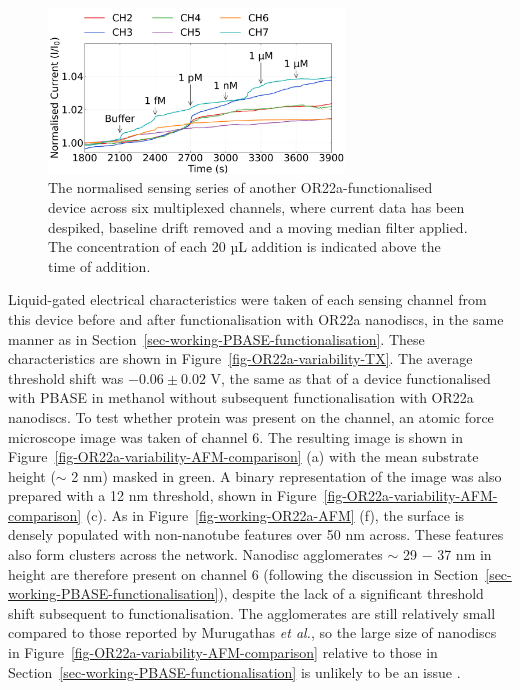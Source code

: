 \documentclass[
  a4paper,
]{scrbook}
\begin{document}
\begin{figure}

{\centering \includegraphics[width=0.7\textwidth,height=\textheight]{figures/ch7/Q4C4_OR22a_Functionalised_filtered_detrend_trunc_arrows_normalised.png}

}

\caption[The normalised sensing series of another OR22a-functionalised
device across six multiplexed channels, where current data has been
despiked, baseline drift removed and a moving median filter
applied.]{\label{fig-OR22a-variability}The normalised sensing series of
another OR22a-functionalised device across six multiplexed channels,
where current data has been despiked, baseline drift removed and a
moving median filter applied. The concentration of each 20 µL addition
is indicated above the time of addition.}

\end{figure}

Liquid-gated electrical characteristics were taken of each sensing
channel from this device before and after functionalisation with OR22a
nanodiscs, in the same manner as in
Section~\ref{sec-working-PBASE-functionalisation}. These characteristics
are shown in Figure~\ref{fig-OR22a-variability-TX}. The average
threshold shift was \(-0.06 \pm 0.02\) V, the same as that of a device
functionalised with PBASE in methanol without subsequent
functionalisation with OR22a nanodiscs. To test whether protein was
present on the channel, an atomic force microscope image was taken of
channel 6. The resulting image is shown in
Figure~\ref{fig-OR22a-variability-AFM-comparison} (a) with the mean
substrate height (\(\sim\) 2 nm) masked in green. A binary
representation of the image was also prepared with a 12 nm threshold,
shown in Figure~\ref{fig-OR22a-variability-AFM-comparison} (c). As in
Figure~\ref{fig-working-OR22a-AFM} (f), the surface is densely populated
with non-nanotube features over 50 nm across. These features also form
clusters across the network. Nanodisc agglomerates \(\sim\) 29 \(-\) 37
nm in height are therefore present on channel 6 (following the
discussion in Section~\ref{sec-working-PBASE-functionalisation}),
despite the lack of a significant threshold shift subsequent to
functionalisation. The agglomerates are still relatively small compared
to those reported by Murugathas \emph{et al.}, so the large size of
nanodiscs in Figure~\ref{fig-OR22a-variability-AFM-comparison} relative
to those in Section~\ref{sec-working-PBASE-functionalisation} is
unlikely to be an issue \autocite{Murugathas2019a}.
\end{document}
